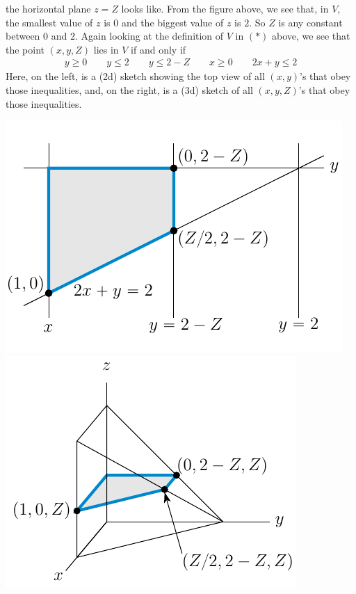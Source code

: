 \begin{eg}
the horizontal plane $z=Z$ looks like. From the figure above, we see that, in $V$, the smallest value of $z$ is $0$ and the biggest value of $z$ is $2$. 
So $Z$ is any constant between $0$ and $2$. Again looking at the definition of $V$ in $(*)$ above, we see that the point $(x,y,Z)$ lies in $V$ if and only if
\begin{align*}
y\ge 0\qquad y\le 2\qquad
y\le 2-Z\qquad
x\ge 0\qquad   
2x+y\le 2
\end{align*}
Here, on the left, is a (2d) sketch showing the top view of all $(x,y)$'s 
that obey those inequalities, and, on the right, is a (3d) sketch of all $(x,y,Z)$'s that obey those inequalities.
\begin{wfig}
\begin{center}
    \includegraphics{figs_integration/xchange3.pdf}\qquad
    \includegraphics{figs_integration/xchange6.pdf}
\end{center}

\end{wfig}
\end{eg}
